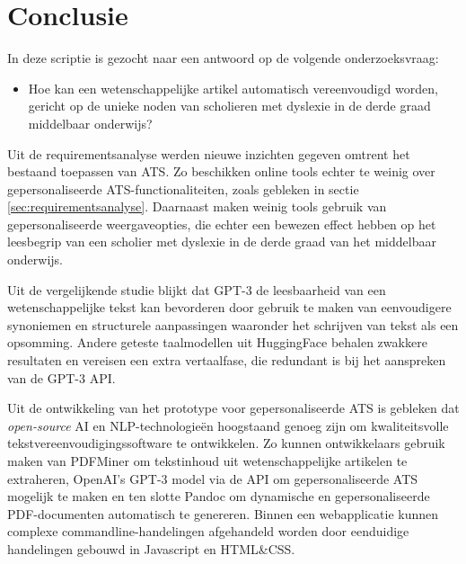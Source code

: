 
\chapter{Conclusie}%
\label{ch:conclusie}

In deze scriptie is gezocht naar een antwoord op de volgende onderzoeksvraag:

\begin{itemize}
	\item Hoe kan een wetenschappelijke artikel automatisch vereenvoudigd worden, gericht op de unieke noden van scholieren met dyslexie in de derde graad middelbaar onderwijs?
\end{itemize}

\medspace

Uit de requirementsanalyse werden nieuwe inzichten gegeven omtrent het bestaand toepassen van ATS. Zo beschikken online tools echter te weinig over gepersonaliseerde ATS-functionaliteiten, zoals gebleken in sectie \ref{sec:requirementsanalyse}. Daarnaast maken weinig tools gebruik van gepersonaliseerde weergaveopties, die echter een bewezen effect hebben op het leesbegrip van een scholier met dyslexie in de derde graad van het middelbaar onderwijs.

\medspace

Uit de vergelijkende studie blijkt dat GPT-3 de leesbaarheid van een wetenschappelijke tekst kan bevorderen door gebruik te maken van eenvoudigere synoniemen en structurele aanpassingen waaronder het schrijven van tekst als een opsomming. Andere geteste taalmodellen uit HuggingFace behalen zwakkere resultaten en vereisen een extra vertaalfase, die redundant is bij het aanspreken van de GPT-3 API.

\medspace

Uit de ontwikkeling van het prototype voor gepersonaliseerde ATS is gebleken dat \textit{open-source} AI en NLP-technologieën hoogstaand genoeg zijn om kwaliteitsvolle tekstvereenvoudigingssoftware te ontwikkelen. Zo kunnen ontwikkelaars gebruik maken van PDFMiner om tekstinhoud uit wetenschappelijke artikelen te extraheren, OpenAI's GPT-3 model via de API om gepersonaliseerde ATS mogelijk te maken en ten slotte Pandoc om dynamische en gepersonaliseerde PDF-documenten automatisch te genereren. Binnen een webapplicatie kunnen complexe commandline-handelingen afgehandeld worden door eenduidige handelingen gebouwd in Javascript en HTML\&CSS.


